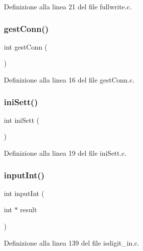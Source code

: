 Definizione alla linea 21 del file fullwrite.\+c.

\mbox{\label{a00050_aee8d8f7af88ed9ef270a00e96a976e30}} 
\subsubsection{\texorpdfstring{gestConn()}{gestConn()}}
{\footnotesize\ttfamily int gest\+Conn (\begin{DoxyParamCaption}{ }\end{DoxyParamCaption})}



Definizione alla linea 16 del file gest\+Conn.\+c.

\mbox{\label{a00050_a280a493f2edcc08fb9c250acac6163ff}} 
\subsubsection{\texorpdfstring{iniSett()}{iniSett()}}
{\footnotesize\ttfamily int ini\+Sett (\begin{DoxyParamCaption}{ }\end{DoxyParamCaption})}



Definizione alla linea 19 del file ini\+Sett.\+c.

\mbox{\label{a00050_adf6dc76d411ca0f1202098a0a3aa2049}} 
\subsubsection{\texorpdfstring{inputInt()}{inputInt()}}
{\footnotesize\ttfamily int input\+Int (\begin{DoxyParamCaption}\item[{int $\ast$}]{result }\end{DoxyParamCaption})}



Definizione alla linea 139 del file isdigit\+\_\+in.\+c.

\mbox{\label{a00050_ac8639575e0352679109d50fdf1d8a09b}} 
